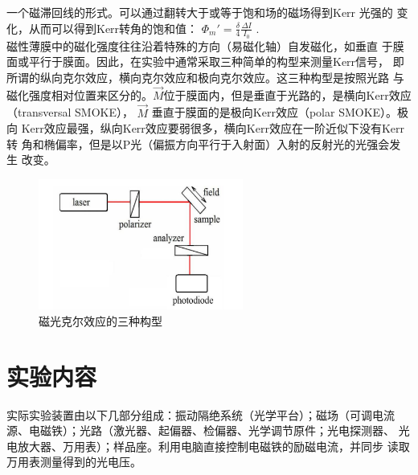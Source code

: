 \documentclass[a4paper]{article}
\begin{document}
一个磁滞回线的形式。可以通过翻转大于或等于饱和场的磁场得到Kerr 光强的
变化，从而可以得到Kerr转角的饱和值： $\varPhi_m ' = \frac{\delta}{4} \frac{\Delta I}{I_0}$ . \\
磁性薄膜中的磁化强度往往沿着特殊的方向（易磁化轴）自发磁化，如垂直
于膜面或平行于膜面。因此，在实验中通常采取三种简单的构型来测量Kerr信号，
即所谓的纵向克尔效应，横向克尔效应和极向克尔效应。这三种构型是按照光路
与磁化强度相对位置来区分的。$\overrightarrow{M}$位于膜面内，但是垂直于光路的，是横向Kerr效应
（transversal SMOKE）， $\overrightarrow{M}$ 垂直于膜面的是极向Kerr效应（polar SMOKE）。极向
Kerr效应最强，纵向Kerr效应要弱很多，横向Kerr效应在一阶近似下没有Kerr转
角和椭偏率，但是以P光（偏振方向平行于入射面）入射的反射光的光强会发生
改变。
\begin{figure}[!h]
    \centering
    \includegraphics[width=0.6\textwidth]{fig/fig1.png}
    \caption{磁光克尔效应的三种构型}\label{fig2}
\end{figure}
\section{实验内容}
实际实验装置由以下几部分组成：振动隔绝系统（光学平台）；磁场（可调电流
源、电磁铁）；光路（激光器、起偏器、检偏器、光学调节原件；光电探测器、
光电放大器、万用表）；样品座。利用电脑直接控制电磁铁的励磁电流，并同步
读取万用表测量得到的光电压。
\end{document}
